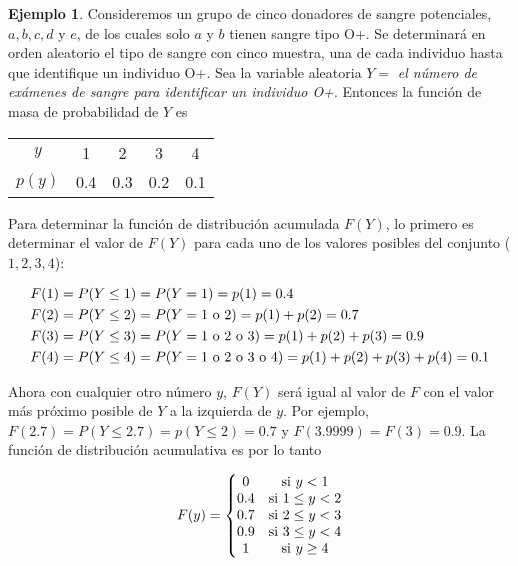 \documentclass[
]{book}
\theoremstyle{definition}
\theoremstyle{definition}
\newtheorem{example}{Ejemplo}[chapter]
\theoremstyle{definition}
\theoremstyle{definition}
\theoremstyle{remark}
\begin{document}
\begin{example}
Consideremos un grupo de cinco donadores de sangre potenciales, \(a, b, c, d\) y \(e\), de los cuales solo \(a\) y \(b\) tienen sangre tipo O+. Se determinará en orden aleatorio el tipo de sangre con cinco muestra, una de cada individuo hasta que identifique un individuo O+. Sea la variable aleatoria \(Y =\) \emph{el número de exámenes de sangre para identificar un individuo O+}. Entonces la función de masa de probabilidad de \(Y\) es

\begin{table}[H]
\centering
\begin{tabular}{ccccc}
\toprule
$y$ & 1 & 2 & 3 & 4\\
$p(y)$ & 0.4 & 0.3 & 0.2 & 0.1\\
\bottomrule
\end{tabular}
\end{table}

Para determinar la función de distribución acumulada \(F(Y)\), lo primero es determinar el valor de \(F(Y)\) para cada uno de los valores posibles del conjunto (\(1,2,3,4\)):

\begin{equation}
\notag
\begin{split}
F(1) &= P(Y\leq 1) = P(Y = 1) = p(1) = 0.4\\
F(2) &= P(Y\leq 2) = P(Y = 1 \text{ o } 2) = p(1) + p(2) = 0.7\\
F(3) &= P(Y\leq 3) = P(Y = 1 \text{ o } 2 \text{ o } 3) = p(1) + p(2) + p(3) = 0.9\\
F(4) &= P(Y\leq 4) = P(Y = 1 \text{ o } 2 \text{ o } 3 \text{ o } 4) = p(1) + p(2) + p(3) + p(4) = 0.1\\
\end{split}
\end{equation}

Ahora con cualquier otro número \(y\), \(F(Y)\) será igual al valor de \(F\) con el valor más próximo posible de \(Y\) a la izquierda de \(y\). Por ejemplo, \(F(2.7) = P(Y\leq 2.7) = p(Y\leq 2) = 0.7\) y \(F(3.9999) = F(3) = 0.9\). La función de distribución acumulativa es por lo tanto

\begin{equation}
\notag
\begin{split}
F(y) = \left\lbrace
\begin{matrix}
0 & \text{si } y < 1\\
0.4 & \text{si } 1\leq y < 2\\
0.7 & \text{si } 2\leq y < 3\\
0.9 & \text{si } 3\leq y < 4\\
1 & \text{si } y\geq 4\\
\end{matrix}
\right.
\end{split}
\end{equation}


\end{example}
\end{document}
